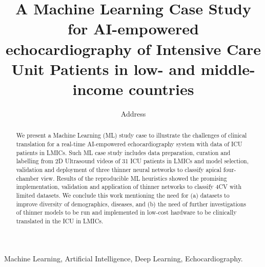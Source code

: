 \documentclass[mlabstract,twocolumn]{jmlr}
\title[Short Title]{
A Machine Learning Case Study for AI-empowered echocardiography of Intensive Care Unit Patients in low- and middle-income countries  %
}
\author{
     \Name{Anonymous Author(s)} \Email{email@sample.com}
      \addr Address
   }
\begin{document}
\maketitle

\begin{abstract}
We present a Machine Learning (ML) study case to illustrate the challenges of clinical translation for a real-time AI-empowered echocardiography system with data of ICU patients in LMICs.
Such ML case study includes data preparation, curation and labelling from 2D Ultrasound videos of 31 ICU patients in LMICs and model selection, validation and deployment of three thinner neural networks to classify apical four-chamber view.
Results of the reproducible ML heuristics showed the promising implementation, validation and application of thinner networks to classify 4CV with limited datasets.
We conclude this work mentioning the need for (a) datasets to improve diversity of demographics, diseases, and (b) the need of further investigations of thinner models to be run and implemented in low-cost hardware to be clinically translated in the ICU in LMICs.
\end{abstract}
\begin{keywords}
Machine Learning, Artificial Intelligence, Deep Learning, Echocardiography.
\end{keywords}
\end{document}
